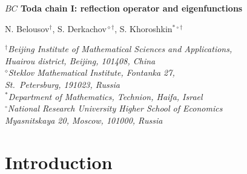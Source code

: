 \documentclass[11pt]{article}
\numberwithin{equation}{section}
\theoremstyle{plain}
\theoremstyle{definition}
\begin{document}
	
\begin{center}
	
	
	{\bf \Large{$BC$ Toda chain I: reflection operator and eigenfunctions }}
	
	\vspace{0.4cm}
	
	{N. Belousov$^{\dagger}$, S. Derkachov$^{\diamond\dagger}$, S. Khoroshkin$^{\ast\circ\dagger}$}
	
	\vspace{0.4cm}
	
	{\small \it
		$^\dagger$Beijing Institute of Mathematical Sciences and Applications, \\
		Huairou district, Beijing, 101408, China \vspace{0.2cm}\\
		$^\diamond$Steklov Mathematical Institute, Fontanka 27, \\St.~Petersburg, 191023, Russia \vspace{0.2cm}\\
		$^\ast$Department of Mathematics, Technion,
		Haifa, Israel\vspace{0.2cm}\\
		$^\circ$National Research University Higher School of Economics\\Myasnitskaya 20, Moscow, 101000, Russia
	}
	
\end{center}

	\begin{abstract} 
		We obtain Gauss--Givental integral representation for the eigenfunctions of quantum Toda chain with boundary interaction of $BC$ type. For this we introduce reflection operator satisfying reflection equation with DST chain Lax matrices. Besides, we define Baxter operators for $BC$ Toda chain, prove their commutativity with Hamiltonians and derive the corresponding Baxter equation.
	\end{abstract}

\vspace{-0.3cm}

\tableofcontents

\section{Introduction} \label{sec:intro}
\end{document}
